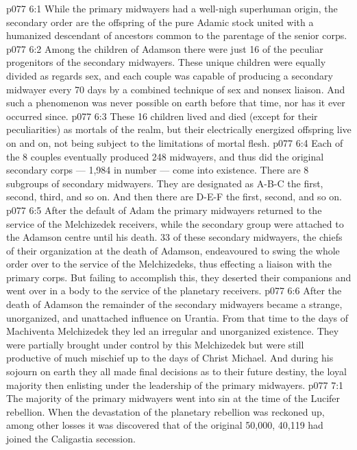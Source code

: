 \vs p077 6:1 While the primary midwayers had a well\hyp{}nigh superhuman origin, the secondary order are the offspring of the pure Adamic stock united with a humanized descendant of ancestors common to the parentage of the senior corps.
\vs p077 6:2 Among the children of Adamson there were just 16 of the peculiar progenitors of the secondary midwayers. These unique children were equally divided as regards sex, and each couple was capable of producing a secondary midwayer every 70 days by a combined technique of sex and nonsex liaison. And such a phenomenon was never possible on earth before that time, nor has it ever occurred since.
\vs p077 6:3 These 16 children lived and died (except for their peculiarities) as mortals of the realm, but their electrically energized offspring live on and on, not being subject to the limitations of mortal flesh.
\vs p077 6:4 Each of the 8 couples eventually produced 248 midwayers, and thus did the original secondary corps --- 1,984 in number --- come into existence. There are 8 subgroups of secondary midwayers. They are designated as A\hyp{}B\hyp{}C the first, second, third, and so on. And then there are D\hyp{}E\hyp{}F the first, second, and so on.
\vs p077 6:5 \pc After the default of Adam the primary midwayers returned to the service of the Melchizedek receivers, while the secondary group were attached to the Adamson centre until his death. 33 of these secondary midwayers, the chiefs of their organization at the death of Adamson, endeavoured to swing the whole order over to the service of the Melchizedeks, thus effecting a liaison with the primary corps. But failing to accomplish this, they deserted their companions and went over in a body to the service of the planetary receivers.
\vs p077 6:6 After the death of Adamson the remainder of the secondary midwayers became a strange, unorganized, and unattached influence on Urantia. From that time to the days of Machiventa Melchizedek they led an irregular and unorganized existence. They were partially brought under control by this Melchizedek but were still productive of much mischief up to the days of Christ Michael. And during his sojourn on earth they all made final decisions as to their future destiny, the loyal majority then enlisting under the leadership of the primary midwayers.
\vs p077 7:1 The majority of the primary midwayers went into sin at the time of the Lucifer rebellion. When the devastation of the planetary rebellion was reckoned up, among other losses it was discovered that of the original 50,000, 40,119 had joined the Caligastia secession.
